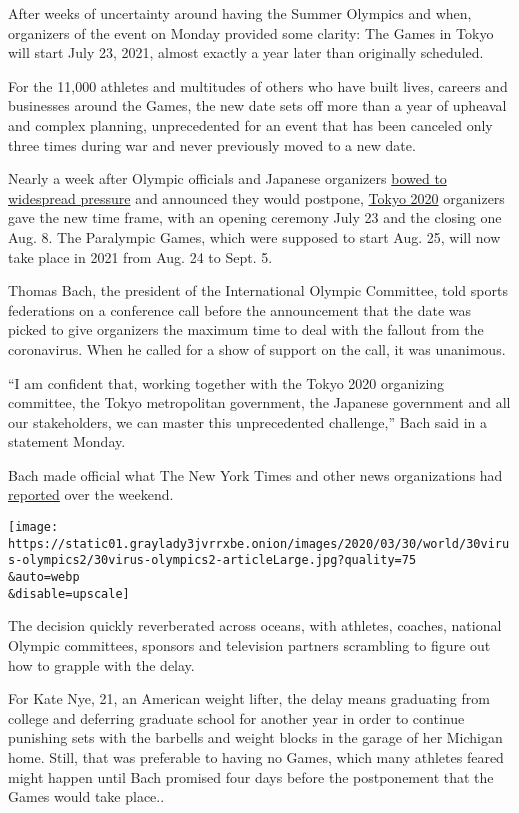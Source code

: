 After weeks of uncertainty around having the Summer Olympics and when,
organizers of the event on Monday provided some clarity: The Games in
Tokyo will start July 23, 2021, almost exactly a year later than
originally scheduled.

For the 11,000 athletes and multitudes of others who have built lives,
careers and businesses around the Games, the new date sets off more than
a year of upheaval and complex planning, unprecedented for an event that
has been canceled only three times during war and never previously moved
to a new date.

Nearly a week after Olympic officials and Japanese organizers
\href{https://www.nytimes3xbfgragh.onion/2020/03/24/sports/olympics/coronavirus-summer-olympics-postponed.html}{bowed
to widespread pressure} and announced they would postpone,
\href{https://www.nytimes3xbfgragh.onion/2020/07/19/sports/2021-tokyo-olympics-protocols.html}{Tokyo
2020} organizers gave the new time frame, with an opening ceremony July
23 and the closing one Aug. 8. The Paralympic Games, which were supposed
to start Aug. 25, will now take place in 2021 from Aug. 24 to Sept. 5.

Thomas Bach, the president of the International Olympic Committee, told
sports federations on a conference call before the announcement that the
date was picked to give organizers the maximum time to deal with the
fallout from the coronavirus. When he called for a show of support on
the call, it was unanimous.

``I am confident that, working together with the Tokyo 2020 organizing
committee, the Tokyo metropolitan government, the Japanese government
and all our stakeholders, we can master this unprecedented challenge,''
Bach said in a statement Monday.

Bach made official what The New York Times and other news organizations
had
\href{https://www.nytimes3xbfgragh.onion/2020/03/28/sports/olympics/coronavirus-olympics-postponed-2021.html}{reported}
over the weekend.

\texttt{[image: https://static01.graylady3jvrrxbe.onion/images/2020/03/30/world/30virus-olympics2/30virus-olympics2-articleLarge.jpg?quality=75\\\&auto=webp\\\&disable=upscale]}

The decision quickly reverberated across oceans, with athletes, coaches,
national Olympic committees, sponsors and television partners scrambling
to figure out how to grapple with the delay.

For Kate Nye, 21, an American weight lifter, the delay means graduating
from college and deferring graduate school for another year in order to
continue punishing sets with the barbells and weight blocks in the
garage of her Michigan home. Still, that was preferable to having no
Games, which many athletes feared might happen until Bach promised four
days before the postponement that the Games would take place..

